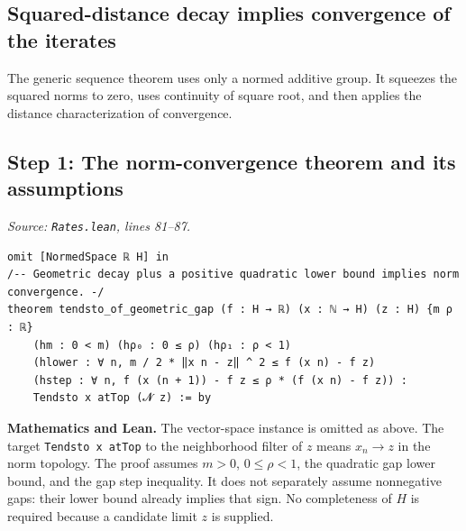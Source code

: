 \documentclass[11pt,a4paper]{article}
\newcommand{\lean}[1]{\ifmmode\text{\nolinkurl{#1}}\else\nolinkurl{#1}\fi}
\newenvironment{proofstep}{%
 \begin{lrbox}{\proofstepbox}\begin{minipage}{\linewidth}%
}{%
 \end{minipage}\end{lrbox}%
 \par\Needspace{\dimexpr\ht\proofstepbox+\dp\proofstepbox+8pt\relax}%
 \noindent\usebox{\proofstepbox}\par\medskip%
}
\begin{document}
\begin{proofstep}

\section{Squared-distance decay implies convergence of the iterates}

The generic sequence theorem uses only a normed additive group. It squeezes the squared norms to zero, uses continuity of square root, and then applies the distance characterization of convergence.

\subsection*{Step 1: The norm-convergence theorem and its assumptions}

\textit{Source: \lean{Rates.lean}, lines 81--87.}
\begin{lstlisting}[style=leanproof,firstnumber=81]
omit [NormedSpace ℝ H] in
/-- Geometric decay plus a positive quadratic lower bound implies norm convergence. -/
theorem tendsto_of_geometric_gap (f : H → ℝ) (x : ℕ → H) (z : H) {m ρ : ℝ}
    (hm : 0 < m) (hρ₀ : 0 ≤ ρ) (hρ₁ : ρ < 1)
    (hlower : ∀ n, m / 2 * ‖x n - z‖ ^ 2 ≤ f (x n) - f z)
    (hstep : ∀ n, f (x (n + 1)) - f z ≤ ρ * (f (x n) - f z)) :
    Tendsto x atTop (𝓝 z) := by
\end{lstlisting}


\textbf{Mathematics and Lean.} The vector-space instance is omitted as above. The target \lean{Tendsto x atTop} to the neighborhood filter of $z$ means $x_n\to z$ in the norm topology. The proof assumes $m>0$, $0\le\rho<1$, the quadratic gap lower bound, and the gap step inequality. It does not separately assume nonnegative gaps: their lower bound already implies that sign. No completeness of $H$ is required because a candidate limit $z$ is supplied.

\end{proofstep}
\end{document}
